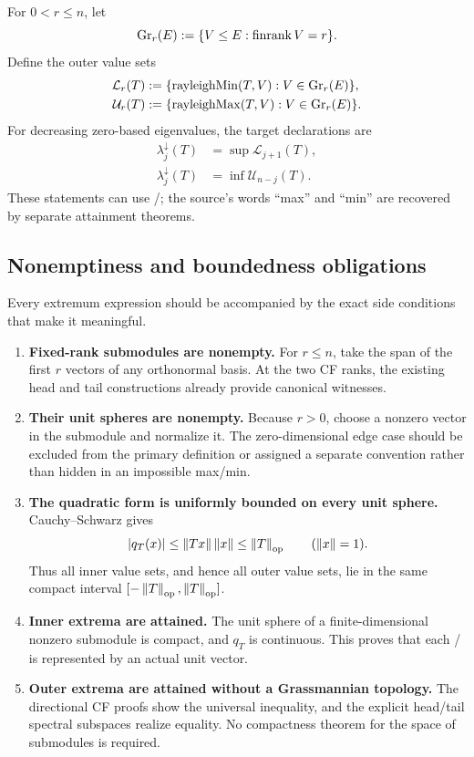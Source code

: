 For $0<r\le n$, let
\[
  \operatorname{Gr}_{r}(E):=\{V\le E:\operatorname{finrank}V=r\}.
\]
Define the outer value sets
\begin{align*}
  \mathcal{L}_r(T)&:=\{\operatorname{rayleighMin}(T,V):V\in\operatorname{Gr}_{r}(E)\},\\
  \mathcal{U}_r(T)&:=\{\operatorname{rayleighMax}(T,V):V\in\operatorname{Gr}_{r}(E)\}.
\end{align*}
For decreasing zero-based eigenvalues, the target declarations are
\begin{align}
  \lambda_j^{\downarrow}(T)&=\sup\mathcal{L}_{j+1}(T), \tag{HJ-Lean-maxmin}\\
  \lambda_j^{\downarrow}(T)&=\inf\mathcal{U}_{n-j}(T). \tag{HJ-Lean-minmax}
\end{align}
These statements can use /; the source's words ``max'' and ``min'' are recovered by separate attainment theorems.

\subsection{Nonemptiness and boundedness obligations}

Every extremum expression should be accompanied by the exact side conditions that make it meaningful.
\begin{enumerate}[leftmargin=2em]
\item \textbf{Fixed-rank submodules are nonempty.} For $r\le n$, take the span of the first $r$ vectors of any orthonormal basis. At the two CF ranks, the existing head and tail  constructions already provide canonical witnesses.
\item \textbf{Their unit spheres are nonempty.} Because $r>0$, choose a nonzero vector in the submodule and normalize it. The zero-dimensional edge case should be excluded from the primary definition or assigned a separate convention rather than hidden in an impossible max/min.
\item \textbf{The quadratic form is uniformly bounded on every unit sphere.} Cauchy--Schwarz gives
\[
  |q_T(x)|\le\left\lVert Tx\right\rVert\left\lVert x\right\rVert\le\left\lVert T\right\rVert_{\mathrm{op}}
  \qquad (\left\lVert x\right\rVert=1).
\]
Thus all inner value sets, and hence all outer value sets, lie in the same compact interval $[-\left\lVert T\right\rVert_{\mathrm{op}},\left\lVert T\right\rVert_{\mathrm{op}}]$.
\item \textbf{Inner extrema are attained.} The unit sphere of a finite-dimensional nonzero submodule is compact, and $q_T$ is continuous. This proves that each / is represented by an actual unit vector.
\item \textbf{Outer extrema are attained without a Grassmannian topology.} The directional CF proofs show the universal inequality, and the explicit head/tail spectral subspaces realize equality. No compactness theorem for the space of submodules is required.
\end{enumerate}

